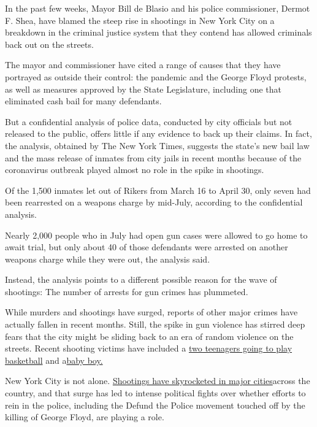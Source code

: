 In the past few weeks, Mayor Bill de Blasio and his police commissioner,
Dermot F. Shea, have blamed the steep rise in shootings in New York City
on a breakdown in the criminal justice system that they contend has
allowed criminals back out on the streets.

The mayor and commissioner have cited a range of causes that they have
portrayed as outside their control: the pandemic and the George Floyd
protests, as well as measures approved by the State Legislature,
including one that eliminated cash bail for many defendants.

But a confidential analysis of police data, conducted by city officials
but not released to the public, offers little if any evidence to back up
their claims. In fact, the analysis, obtained by The New York Times,
suggests the state's new bail law and the mass release of inmates from
city jails in recent months because of the coronavirus outbreak played
almost no role in the spike in shootings.

Of the 1,500 inmates let out of Rikers from March 16 to April 30, only
seven had been rearrested on a weapons charge by mid-July, according to
the confidential analysis.

Nearly 2,000 people who in July had open gun cases were allowed to go
home to await trial, but only about 40 of those defendants were arrested
on another weapons charge while they were out, the analysis said.

Instead, the analysis points to a different possible reason for the wave
of shootings: The number of arrests for gun crimes has plummeted.

While murders and shootings have surged, reports of other major crimes
have actually fallen in recent months. Still, the spike in gun violence
has stirred deep fears that the city might be sliding back to an era of
random violence on the streets. Recent shooting victims have included a
\href{https://www.nytimes3xbfgragh.onion/2020/07/27/nyregion/nyc-shootings-weekend.html?searchResultPosition=1}{two
teenagers going to play basketball} and
a\href{https://www.nytimes3xbfgragh.onion/2020/07/13/nyregion/Davell-Gardner-brooklyn-shooting.html?searchResultPosition=9}{baby
boy.}

New York City is not alone.
\href{https://www.nytimes3xbfgragh.onion/2020/07/05/us/chicago-shootings.html?searchResultPosition=6}{Shootings
have skyrocketed in major cities}across the country, and that surge has
led to intense political fights over whether efforts to rein in the
police, including the Defund the Police movement touched off by the
killing of George Floyd, are playing a role.


